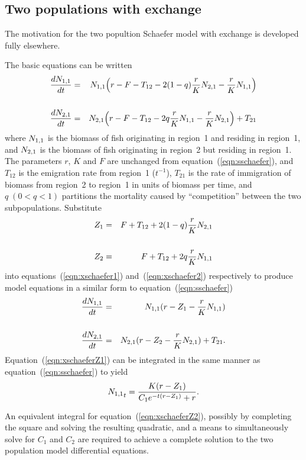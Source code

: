 \subsection{Two populations with exchange}
The motivation for the two popultion Schaefer model with exchange is
developed fully elsewhere. %

The basic equations can be written
\begin{eqnarray}
\label{eqn:xschaefer1}
\frac{d{N_{1,1}}}{dt}&=&{N_{1,1}}\Big(r-F-T_{12}-2(1-q)\frac{r}{K}{N_{2,1}}-\frac{r}{K}{N_{1,1}}\Big)\\
\nonumber\\
\label{eqn:xschaefer2}
\frac{d{N_{2,1}}}{dt}&=&{N_{2,1}}\Big(r-F-T_{12}-2q\frac{r}{K}{N_{1,1}}-\frac{r}{K}{N_{2,1}}\Big)+T_{21}
\end{eqnarray}
where ${N_{1,1}}$ is the biomass of fish originating in region~1
and residing in region~1,
and ${N_{2,1}}$ is the biomass of fish originating in region~2
but residing in region~1.
The parameters $r$, $K$ and $F$ are unchanged from
equation~(\ref{eqn:sschaefer}), and
$T_{12}$ is the emigration rate from region~1 ($t^{-1}$), 
$T_{21}$ is the rate of immigration of biomass from region~2 to
region~1 in units of biomass per time,
and $q\;(0 < q < 1)$ partitions the mortality caused by ``competition''
between the two subpopulations.
Substitute
\begin{eqnarray}
\label{eqn:Zdef}
Z_1&=&F+T_{12}+2(1-q)\frac{r}{K}{N_{2,1}}\\
\nonumber\\
Z_2&=&F+T_{12}+2q\frac{r}{K}{N_{1,1}}
\end{eqnarray}
into equations~(\ref{eqn:xschaefer1}) and~(\ref{eqn:xschaefer2})
respectively to produce model equations in a similar form to
equation~(\ref{eqn:sschaefer})
\begin{eqnarray}
\label{eqn:xschaeferZ1}
\frac{d{N_{1,1}}}{dt}&=&{N_{1,1}}(r-Z_1-\frac{r}{K}{N_{1,1}})\\
\nonumber\\
\label{eqn:xschaeferZ2}
\frac{d{N_{2,1}}}{dt}&=&{N_{2,1}}(r-Z_2-\frac{r}{K}{N_{2,1}})+T_{21}.
\end{eqnarray}
Equation~(\ref{eqn:xschaeferZ1}) can be integrated in the same manner as
equation~(\ref{eqn:sschaefer}) to yield
\begin{equation}
\label{eqn:N1tC}
{N_{1,1}}_t=\frac{K(r-Z_1)}{C_1e^{-t(r-Z_1)}+r}.
\end{equation}


An equivalent integral for
equation~(\ref{eqn:xschaeferZ2}), possibly by completing the square and
solving the resulting quadratic, and a means to simultaneously solve
for $C_1$ and $C_2$ are required to achieve a complete solution to
the two population model differential equations.

